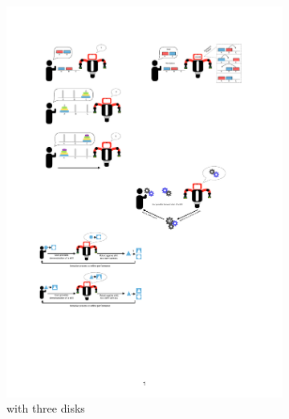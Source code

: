 \begin{figure}[htp]
\centering
\begin{subfigure}[t]{0.45\textwidth}
	\includegraphics[width=\textwidth]{figures/hanoi-0}
	\caption{with three disks}		
	\label{fig:Tower of Hanoi 3}
\end{subfigure}\hfill
\begin{subfigure}[t]{0.45\textwidth}

\end{subfigure}
\end{figure}
